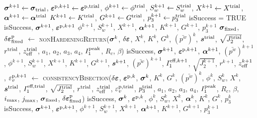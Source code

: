 \begin{breakablealgorithm}
\begin{algorithmic}[1]
        \State $\boldsymbol{\sigma}^{k+1} \leftarrow \boldsymbol{\sigma}_{\text{trial}}$,
               $\boldsymbol{\varepsilon}^{\text{p},{k+1}} \leftarrow \boldsymbol{\varepsilon}^{\text{p},\text{trial}}$,
               $\phi^{k+1} \leftarrow \phi^{\text{trial}}$,
               $S_w^{k+1} \leftarrow S_w^{\text{trial}}$,
               $X^{k+1} \leftarrow X^{\text{trial}}$,
               $\boldsymbol{\alpha}^{k+1} \leftarrow \boldsymbol{\alpha}^{\text{trial}}$
        \State $K^{k+1} \leftarrow K^{\text{trial}}$, $G^{k+1} \leftarrow G^{\text{trial}}$, 
               $p_3^{k+1} \leftarrow p_3^{\text{trial}}$ \WRP
        \State isSuccess = TRUE
        \State \Return isSuccess, $\boldsymbol{\sigma}^{k+1}$, $\boldsymbol{\varepsilon}^{\text{p},{k+1}}$ $\phi^{k+1}$, $S_w^{k+1}$, $X^{k+1}$,
               $\boldsymbol{\alpha}^{k+1}$, $K^{k+1}$, $G^{k+1}$, $p_3^{k+1}$
      \EndIf
      \State $\boldsymbol{\sigma}_{\text{fixed}}$, $\delta\boldsymbol{\varepsilon}^{\text{p}}_{\text{fixed}}$ $\leftarrow$
        \textsc{nonHardeningReturn}($\boldsymbol{\sigma}^k$, $\delta\boldsymbol{\varepsilon}$, $X^k$, $K^k$, $G^k$, $(\bar{p^w})^k$, \WRP
           $\boldsymbol{s}^{\text{trial}}$, $\sqrt{J_2^{\text{trial}}}$, $r^{\text{trial}}$, $z_{\text{eff}}^{\text{trial}}$, 
           $a_1$, $a_2$, $a_3$, $a_4$, $I_1^{\text{peak}}$, $R_c$, $\beta$) \WRP 
      \State isSuccess, $\boldsymbol{\sigma}^{k+1}$, $\boldsymbol{\varepsilon}^{\text{p},{k+1}}$, $\boldsymbol{\alpha}^{k+1}$,
        $(\bar{p^w})^{k+1}$, $\phi^{k+1}$, $S_w^{k+1}$, $X^{k+1}$, $K^{k+1}$, $G^{k+1}$, 
        $\boldsymbol{s}^{k+1}$, $(\bar{p^w})^{k+1}$, $I_1^{\text{eff},{k+1}}$, $\sqrt{J_2^{k+1}}$, \WRP
        $r^{k+1}$, $z_{\text{eff}}^{k+1}$, $\varepsilon_v^{\text{p},{k+1}}$
        $\leftarrow$ \textsc{consistencyBisection}($\delta\boldsymbol{\varepsilon}$, $\boldsymbol{\varepsilon}^{\text{p},k}$, 
           $\boldsymbol{\sigma}^k$, $K^k$, $G^k$, $(\bar{p^w})^k$, $\phi^k$, $S_w^k$, $X^k$, \WRP
           $\boldsymbol{s}^{\text{trial}}$, $I_1^{\text{eff},\text{trial}}$, $\sqrt{J_2^{\text{trial}}}$, 
           $r^{\text{trial}}$, $z_{\text{eff}}^{\text{trial}}$, $\varepsilon_v^{\text{p},\text{trial}}$,
           $p_3^{\text{trial}}$, $a_1$, $a_2$, $a_3$, $a_4$, $I_1^{\text{peak}}$, 
           $R_c$, $\beta$, $i_{\text{max}}$, $j_{\text{max}}$, \WRP
           $\boldsymbol{\sigma}_{\text{fixed}}$, $\delta\boldsymbol{\varepsilon}^{\text{p}}_{\text{fixed}}$)
        \State \Return isSuccess, $\boldsymbol{\sigma}^k$, $\boldsymbol{\varepsilon}^{\text{p},k}$, $\phi^k$, $S_w^k$, $X^k$, 
          $\boldsymbol{\alpha}^k$, $K^k$, $G^k$, $p_3^k$
      \EndIf
      \State \Return isSuccess, $\boldsymbol{\sigma}^{k+1}$, $\boldsymbol{\varepsilon}^{\text{p},{k+1}}$, $\phi^{k+1}$, $S_w^{k+1}$, $X^{k+1}$, 
          $\boldsymbol{\alpha}^{k+1}$, $K^{k+1}$, $G^{k+1}$, $p_3^{k+1}$
    \EndProcedure
  \end{algorithmic}
\end{breakablealgorithm}

